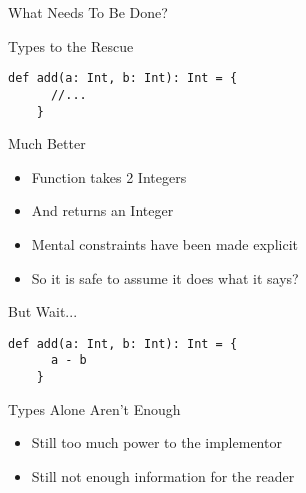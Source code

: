 \begin{section}{What Needs To Be Done?}
\begin{frame}[fragile]{Types to the Rescue}
  \begin{lstlisting}[style=scala]
    def add(a: Int, b: Int): Int = {
      //...
    }
  \end{lstlisting}
\end{frame}

\begin{frame}[fragile]{Much Better}
  \begin{itemize}
  \item Function takes 2 Integers
  \item And returns an Integer
  \item Mental constraints have been made explicit
  \item So it is safe to assume it does what it says?
  \end{itemize}
\end{frame}

\begin{frame}[fragile]{But Wait...}
  \begin{lstlisting}[style=scala]
    def add(a: Int, b: Int): Int = {
      a - b
    }
  \end{lstlisting}
\end{frame}

\begin{frame}[fragile]{Types Alone Aren't Enough}
  \begin{itemize}
  \item Still too much power to the implementor
  \item Still not enough information for the reader
  \end{itemize}
\end{frame}

\end{section}
